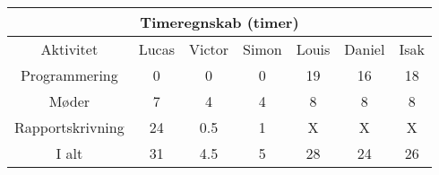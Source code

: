 \centering
\begin{tabular}{ |c|c|c|c|c|c|c|  }
 \hline
 \multicolumn{7}{|c|}{Timeregnskab (timer)} \\
 \hline
 Aktivitet & Lucas & Victor & Simon & Louis & Daniel & Isak\\
 \hline
 
 
 Programmering      & 0 & 0 & 0 & 19 & 16 & 18 \\
 
 Møder              & 7 & 4 & 4 & 8 & 8 & 8 \\
 
 Rapportskrivning   & 24 & 0.5 & 1 & X & X & X \\
 
 \hline
 
 I alt              & 31 & 4.5 & 5 & 28 & 24 & 26 \\
 
 
 \hline
\end{tabular}